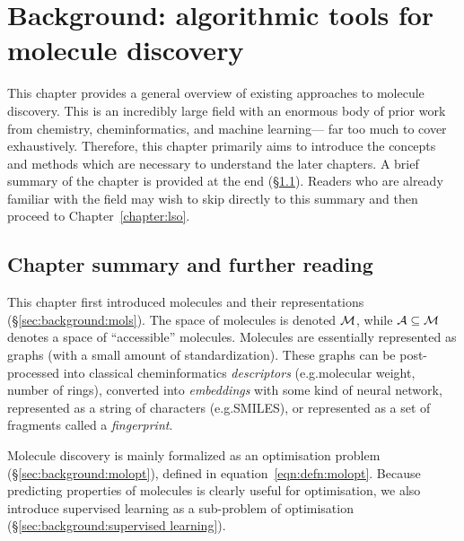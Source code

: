 
\chapter{Background: algorithmic tools for molecule discovery}
\label{chapter:background}

\ifpdf
    \graphicspath{{chapter02-background/figures}}
\else
    \graphicspath{}
\fi

This chapter provides a general overview of existing approaches to molecule discovery.
This is an incredibly large field with an enormous body of prior work
from chemistry, cheminformatics, and machine learning---
far too much to cover exhaustively.
Therefore, this chapter primarily aims to introduce the concepts and methods which
are necessary to understand the later chapters.
A brief summary of the chapter is provided at the end (\S\ref{sec:background:summary}).
Readers who are already familiar with the field may wish to skip directly to this summary
and then proceed to Chapter~\ref{chapter:lso}.










\section{Chapter summary and further reading}
\label{sec:background:summary}

This chapter first introduced molecules and their representations (\S\ref{sec:background:mols}).
The space of molecules is denoted $\mathcal{M}$, while $\mathcal{A}\subseteq\mathcal{M}$ denotes
a space of ``accessible'' molecules.
Molecules are essentially represented as graphs (with a small amount of standardization).
These graphs can be post-processed into classical cheminformatics \emph{descriptors} (e.g.\@ molecular weight, number of rings),
converted into \emph{embeddings} with some kind of neural network,
represented as a string of characters (e.g.\@ SMILES),
or represented as a set of fragments called a \emph{fingerprint}.

Molecule discovery is mainly formalized as an optimisation problem (\S\ref{sec:background:molopt}),
defined in equation~\ref{eqn:defn:molopt}.
Because predicting properties of molecules is clearly useful for optimisation,
we also introduce supervised learning as a sub-problem of optimisation (\S\ref{sec:background:supervised learning}).


